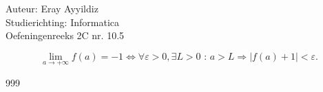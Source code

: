 \documentclass[a4paper]{article}
\begin{document}
  
\noindent \large Auteur: Eray Ayyildiz \\ 
\noindent \large Studierichting: Informatica \\ 
\noindent \large Oefeningenreeks 2C nr. 10.5 \\

\medskip

\normalsize

$$ \lim\limits_{a \to +\infty} f(a) = -1 \Leftrightarrow \forall \varepsilon > 0, \exists L > 0 \text{ : } a > L \Rightarrow |f(a) + 1| < \varepsilon.$$




\begin{thebibliography}{999}
\end{thebibliography}
\end{document}
